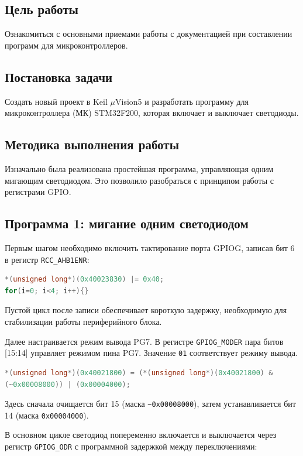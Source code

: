 \subsection*{Цель работы}
Ознакомиться с основными приемами работы с документацией при составлении программ для микроконтроллеров.

\subsection*{Постановка задачи}
Создать новый проект в Keil $\mu$Vision5 и разработать программу для микроконтроллера (МК) STM32F200, которая включает и выключает светодиоды.

\subsection*{Методика выполнения работы}

Изначально была реализована простейшая программа, управляющая одним мигающим светодиодом. Это позволило разобраться с принципом работы с регистрами GPIO.

\subsection*{Программа 1: мигание одним светодиодом}

Первым шагом необходимо включить тактирование порта GPIOG, записав бит 6 в регистр \texttt{RCC\_AHB1ENR}:

\begin{lstlisting}[language=C]
*(unsigned long*)(0x40023830) |= 0x40;
for(i=0; i<4; i++){}
\end{lstlisting}

Пустой цикл после записи обеспечивает короткую задержку, необходимую для стабилизации работы периферийного блока.

Далее настраивается режим вывода PG7. В регистре \texttt{GPIOG\_MODER} пара битов [15:14] управляет режимом пина PG7. Значение \texttt{01} соответствует режиму вывода.

\begin{lstlisting}[language=C]
*(unsigned long*)(0x40021800) = (*(unsigned long*)(0x40021800) &
(~0x00008000)) | (0x00004000);
\end{lstlisting}

Здесь сначала очищается бит 15 (маска \texttt{\textasciitilde 0x00008000}), затем устанавливается бит 14 (маска \texttt{0x00004000}).

В основном цикле светодиод попеременно включается и выключается через регистр \texttt{GPIOG\_ODR} с программной задержкой между переключениями:

